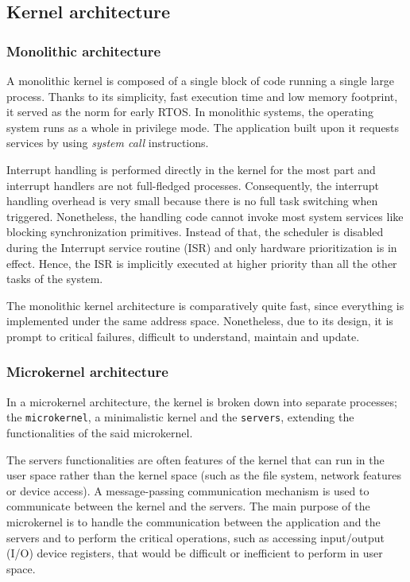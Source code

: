 \subsection{Kernel architecture}

\subsubsection{Monolithic architecture}
A monolithic kernel is composed of a single block of code running a single large process.
Thanks to its simplicity, fast execution time and low memory footprint, it served as the norm for early RTOS.
In monolithic systems, the operating system runs as a whole in privilege mode.
The application built upon it requests services by using \textit{system call} instructions.

Interrupt handling is performed directly in the kernel for the most part and interrupt handlers are not full-fledged processes.
Consequently, the interrupt handling overhead is very small because there is no full task switching when triggered.
Nonetheless, the handling code cannot invoke most system services like blocking synchronization primitives.
Instead of that, the scheduler is disabled during the Interrupt service routine (ISR) and only hardware prioritization is in effect.
Hence, the ISR is implicitly executed at higher priority than all the other tasks of the system.

The monolithic kernel architecture is comparatively quite fast, since ev\-ery\-thing is implemented under the same address space.
Nonetheless, due to its design, it is prompt to critical failures, difficult to understand, maintain and update.

\subsubsection{Microkernel architecture}
In a microkernel architecture, the kernel is broken down into separate processes;
     the \texttt{microkernel}, a minimalistic kernel
     and the \texttt{servers}, extending the functionalities of the said microkernel.

The servers functionalities are often features of the kernel that can run in the user space
    rather than the kernel space (such as the file system, network features or device access).
A message-passing communication mechanism is used to communicate between the kernel and the servers.
The main purpose of the microkernel is to handle the communication between the application and the servers
    and to perform the critical operations, such as accessing input/output (I/O) device registers, that would be difficult or inefficient to perform in user space.

